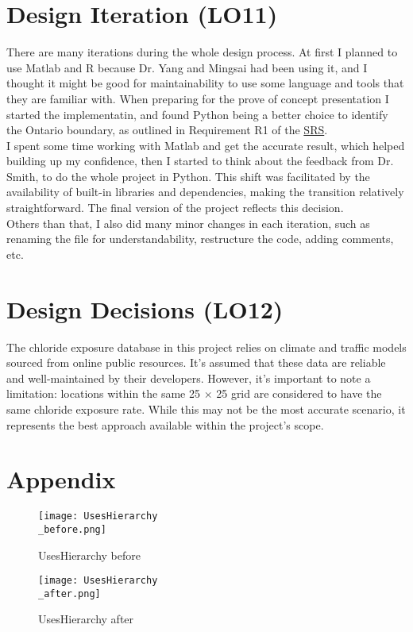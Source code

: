 \documentclass{article}
\begin{document}
\section{Design Iteration (LO11)}
There are many iterations during the whole design process. At first I planned to use Matlab and R because Dr. Yang and Mingsai had been using it, and I thought it might be good for maintainability to use some language and tools that they are familiar with. When preparing for the prove of concept presentation I started the implementatin, and found Python being a better choice to identify the Ontario boundary, as outlined in Requirement R1 of the \href{https://github.com/CynthiaLiu0805/BridgeCorrosion/blob/main/docs/SRS/SRS.pdf}{SRS}. \\
I spent some time working with Matlab and get the accurate result, which helped building up my confidence, then I started to think about the feedback from Dr. Smith, to do the whole project in Python. This shift was facilitated by the availability of built-in libraries and dependencies, making the transition relatively straightforward. The final version of the project reflects this decision.\\
Others than that, I also did many minor changes in each iteration, such as renaming the file for understandability, restructure the code, adding comments, etc.

\section{Design Decisions (LO12)}
The chloride exposure database in this project relies on climate and traffic models sourced from online public resources. It's assumed that these data are reliable and well-maintained by their developers. However, it's important to note a limitation: locations within the same 25 $\times$ 25 grid are considered to have the same chloride exposure rate. While this may not be the most accurate scenario, it represents the best approach available within the project's scope.

\section{Appendix}\label{appendix}

\begin{figure}[!htb]
\begin{minipage}[c]{0.45\linewidth}
\texttt{[image: UsesHierarchy\\\_before.png]}
\caption{UsesHierarchy before}
\end{minipage}
\hfill
\begin{minipage}[c]{0.45\linewidth}
\texttt{[image: UsesHierarchy\\\_after.png]}
\caption{UsesHierarchy after}
\end{minipage}%
\end{figure}
\end{document}
